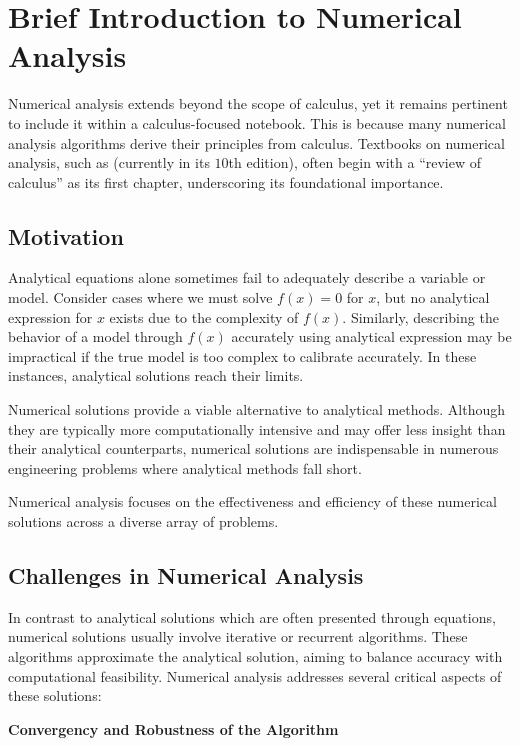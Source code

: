 \chapter{Brief Introduction to Numerical Analysis}

Numerical analysis extends beyond the scope of calculus, yet it remains pertinent to include it within a calculus-focused notebook. This is because many numerical analysis algorithms derive their principles from calculus. Textbooks on numerical analysis, such as \cite{burden1997numerical} (currently in its $10$th edition), often begin with a ``review of calculus'' as its first chapter, underscoring its foundational importance.

\section{Motivation}

Analytical equations alone sometimes fail to adequately describe a variable or model. Consider cases where we must solve $f(x) = 0$ for $x$, but no analytical expression for $x$ exists due to the complexity of $f(x)$. Similarly, describing the behavior of a model through $f(x)$ accurately using analytical expression may be impractical if the true model is too complex to calibrate accurately. In these instances, analytical solutions reach their limits.

Numerical solutions provide a viable alternative to analytical methods. Although they are typically more computationally intensive and may offer less insight than their analytical counterparts, numerical solutions are indispensable in numerous engineering problems where analytical methods fall short.

Numerical analysis focuses on the effectiveness and efficiency of these numerical solutions across a diverse array of problems.

\section{Challenges in Numerical Analysis}

In contrast to analytical solutions which are often presented through equations, numerical solutions usually involve iterative or recurrent algorithms. These algorithms approximate the analytical solution, aiming to balance accuracy with computational feasibility. Numerical analysis addresses several critical aspects of these solutions:

\vspace{0.1in}
\noindent \textbf{Convergency and Robustness of the Algorithm}
\vspace{0.1in}


